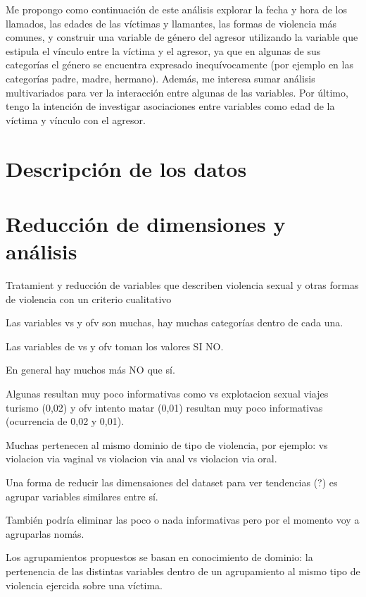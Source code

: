 \documentclass[10 pt]{article}
\begin{document}
Me propongo como continuación de este análisis explorar la fecha y hora de los llamados, las edades de las víctimas y llamantes, las formas de violencia más comunes, y construir una variable de género del agresor utilizando la variable que estipula el vínculo entre la víctima y el agresor, ya que en algunas de sus categorías el género se encuentra expresado inequívocamente (por ejemplo en las categorías padre, madre, hermano). Además, me interesa sumar análisis multivariados para ver la interacción entre algunas de las variables. Por último, tengo la intención de investigar asociaciones entre variables como edad de la víctima y vínculo con el agresor.


\section{Descripción de los datos}\label{dat}

\section{Reducción de dimensiones y análisis}\label{red}




Tratamient y reducción de variables que describen violencia sexual y otras formas de violencia con un criterio cualitativo

Las variables vs y ofv son muchas, hay muchas categorías dentro de cada una.

Las variables de vs y ofv toman los valores SI NO.

En general hay muchos más NO que sí.

Algunas resultan muy poco informativas como vs explotacion sexual viajes turismo (0,02) y ofv intento matar (0,01) resultan muy poco informativas (ocurrencia de 0,02 y 0,01).

Muchas pertenecen al mismo dominio de tipo de violencia, por ejemplo: vs violacion via vaginal vs violacion via anal vs violacion via oral.

Una forma de reducir las dimensaiones del dataset para ver tendencias (?)  es agrupar variables similares entre sí.

También podría eliminar las poco o nada informativas pero por el momento voy a agruparlas nomás.

Los agrupamientos propuestos se basan en conocimiento de dominio: la pertenencia de las distintas variables dentro de un agrupamiento al mismo tipo de violencia ejercida sobre una víctima.
\end{document}
